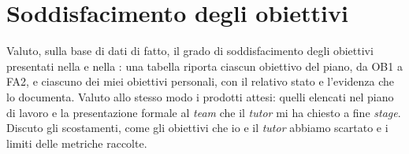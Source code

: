 
\section{Soddisfacimento degli obiettivi}
\label{sec:soddisfacimento}

Valuto, sulla base di dati di fatto, il grado di soddisfacimento degli obiettivi presentati nella
 e nella : una tabella riporta ciascun
obiettivo del piano, da OB1 a FA2, e ciascuno dei miei obiettivi personali, con il relativo stato e
l’evidenza che lo documenta. Valuto allo stesso modo i prodotti attesi: quelli elencati nel piano di
lavoro e la presentazione formale al \emph{team} che il \emph{tutor} mi ha chiesto a fine
\emph{stage}. Discuto gli scostamenti, come gli obiettivi che io e il \emph{tutor} abbiamo scartato
e i limiti delle metriche raccolte.
